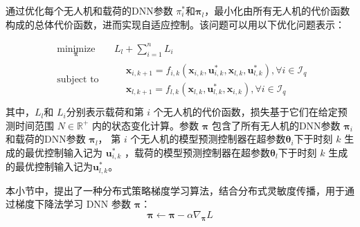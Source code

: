 \documentclass[lang=chs, degree=master, blindreview=true, winfonts=true]{yanputhesis}
\begin{document}
通过优化每个无人机和载荷的DNN参数 \( \pi_i^* \)和\(\bm \pi_l\)，最小化由所有无人机的代价函数构成的总体代价函数，进而实现自适应控制。该问题可以用以下优化问题表示：

\begin{equation}
	\begin{aligned} 
		&\operatorname*{minimize}_{\bm{\pi}} & & L_l+\sum_{i=1}^{n}L_i \\
		&\text{subject to} & & \begin{aligned}
			&\boldsymbol{x}_{i,{k+1}} = {{f}}_{i,k}\left(\boldsymbol{x}_{i,k}, \boldsymbol{u}^*_{i,{k}},  \boldsymbol{x}_{l,k}, \boldsymbol{u}^*_{l,{k}}\right), \forall i \in \mathcal{I}_q \\
			&\boldsymbol{x}_{l,{k+1}} = {{f}}_{l,k}\left(\boldsymbol{x}_{l,k}, \boldsymbol{u}^*_{{l},{k}},  \boldsymbol{x}_{i,k}\right), \forall i \in \mathcal{I}_q
		\end{aligned} \\
	\end{aligned}
\end{equation}
其中，$L_l $和 $L_i$分别表示载荷和第 \(i\) 个无人机的代价函数，损失基于它们在给定预测时间范围 \( N \in \mathbb{R}^+ \) 内的状态变化计算。参数 \(\bm \pi \) 包含了所有无人机的DNN参数 \( \bm \pi_i \)和载荷的DNN参数 \( \bm \pi_l \)，
第 \(i\) 个无人机的模型预测控制器在超参数\( \boldsymbol{\theta}_i \)下于时刻 \(k\) 生成的最优控制输入记为 \( \boldsymbol{u}^*_{i,{k}} \) ，载荷的模型预测控制器在超参数\( \boldsymbol{\theta}_l \)下于时刻 \(k\) 生成的最优控制输入记为\( \boldsymbol{u}^*_{l,{k}} \)。


本小节中，提出了一种分布式策略梯度学习算法，结合分布式灵敏度传播，用于通过梯度下降法学习 DNN 参数 $\bm \pi$：
\begin{equation}
    \bm \pi\leftarrow \bm \pi-\alpha\nabla_{\bm \pi}L
\end{equation}
\end{document}
